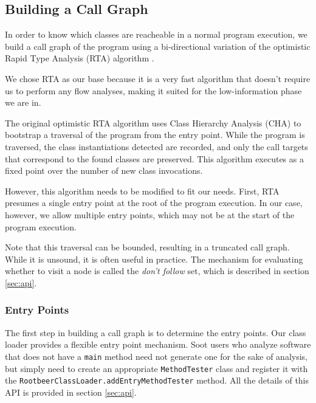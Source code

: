 \documentclass{sigplanconf}
\begin{document}
\subsection{Building a Call Graph}
\label{sec:cg}
In order to know which classes are reacheable in a normal program execution, we build a call graph of the program using a bi-directional variation of the optimistic Rapid Type Analysis (RTA) algorithm \cite{BaconRTA, Sundaresan:2000:PVM:354222.353189}.

We chose RTA as our base because it is a very fast algorithm that doesn't require us to perform any flow analyses, making it suited for the low-information phase we are in.

The original optimistic RTA algorithm uses Class Hierarchy Analysis (CHA) \cite{deanetal} to bootstrap a traversal of the program from the entry point. While the program is traversed, the class instantiations detected are recorded, and only the call targets that correspond to the found classes are preserved. This algorithm executes as a fixed point over the number of new class invocations.

However, this algorithm needs to be modified to fit our needs. First, RTA presumes a single entry point at the root of the program execution. In our case, however, we allow multiple entry points, which may not be at the start of the program execution. %


Note that this traversal can be bounded, resulting in a truncated call graph. While it is unsound, it is often useful in practice. The mechanism for evaluating whether to visit a node is called the \emph{don't follow} set, which is described in section \ref{sec:api}.

\subsubsection{Entry Points}
The first step in building a call graph is to determine the entry points. Our class loader provides a flexible entry point mechanism. Soot users who analyze software that does not have a {\tt main} method need not generate one for the sake of analysis, but simply need to create an appropriate {\tt MethodTester} class and register it with the {\tt RootbeerClassLoader.addEntryMethodTester} method. All the details of this API is provided in section \ref{sec:api}.
\end{document}
